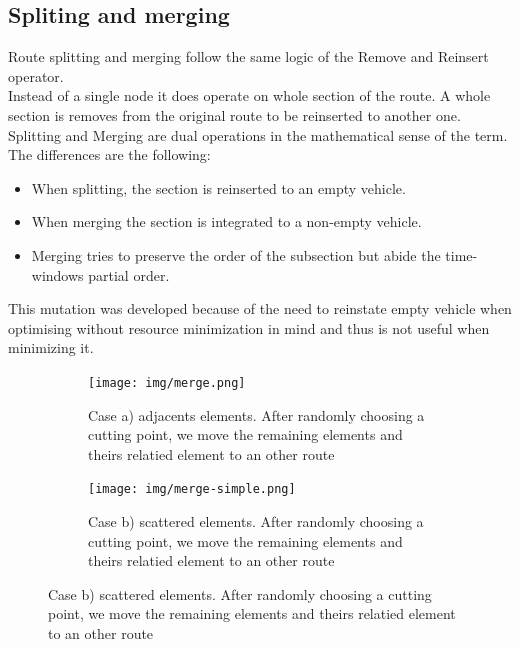 \documentclass[12pt]{memoir}
\begin{document}
\subsection{Spliting and merging}
Route splitting and merging\cite{tan2003multiobjective} follow the same logic of the Remove and Reinsert operator.\\
Instead of a single node it does operate on whole section of the route. A whole section
is removes from the original route to be reinserted to another one. Splitting and Merging are
dual operations in the mathematical sense of the term.\\
The differences are the following:
\begin{itemize}
  \item When splitting, the section is reinserted to an empty vehicle.
  \item When merging the section is integrated to a non-empty vehicle.
  \item Merging tries to preserve the order of the subsection but abide the time-windows partial order.
\end{itemize}
This mutation was developed because of the need to reinstate empty vehicle when optimising without
resource minimization in mind and thus is not useful when minimizing it.

\begin{figure}[htbp]
\centering
	\begin{subfigure}{.5\textwidth}
                        \centering
			\texttt{[image: img/merge.png]}
			\caption{Case a) adjacents elements. After randomly choosing a cutting point, we move the remaining
      elements and theirs relatied element to an other route }
	
	\end{subfigure}%
	\begin{subfigure}{.5\textwidth}
                        \centering
			\texttt{[image: img/merge-simple.png]}
			\caption{Case b) scattered elements. After randomly choosing a cutting point, we move the remaining
      elements and theirs relatied element to an other route }

	\end{subfigure}
\end{figure}
\end{document}
